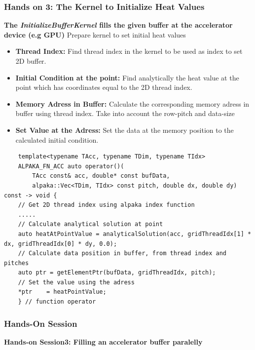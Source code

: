 \documentclass[9pt]{beamer}
\begin{document}
\begin{frame}[fragile]
\frametitle{Hands on 3: The Kernel to Initialize Heat Values}
\small

\textbf{ The \textit{InitializeBufferKernel} fills the given buffer at the accelerator device (e.g GPU)}
    \lstset{basicstyle=\ttfamily\scriptsize}
    Prepare kernel to set initial heat values
    \begin{itemize}
    \item \textbf{Thread Index:} Find thread index in the kernel to be used as index to set 2D buffer.
    \item \textbf{Initial Condition at the point:} Find analytically the heat value at the point which has coordinates equal to the 2D thread index.
    \item \textbf{Memory Adress in Buffer:} Calculate the corresponding memory adress in buffer using thread index. Take into account the row-pitch and data-size
    \item \textbf{Set Value at the Adress:} Set the data at the memory position to the calculated initial condition.
    \end{itemize}
     \lstset{basicstyle=\ttfamily\tiny}
    \begin{lstlisting}
    template<typename TAcc, typename TDim, typename TIdx>
    ALPAKA_FN_ACC auto operator()(
        TAcc const& acc, double* const bufData,
        alpaka::Vec<TDim, TIdx> const pitch, double dx, double dy) const -> void {
    // Get 2D thread index using alpaka index function
    .....
    // Calculate analytical solution at point
    auto heatAtPointValue = analyticalSolution(acc, gridThreadIdx[1] * dx, gridThreadIdx[0] * dy, 0.0);
    // Calculate data position in buffer, from thread index and pitches
    auto ptr = getElementPtr(bufData, gridThreadIdx, pitch);
    // Set the value using the adress
    *ptr    = heatPointValue;
    } // function operator
    \end{lstlisting}

\end{frame}





\begin{frame}
\frametitle{Hands-On Session}
\begin{center}
      \Huge \textbf{Hands-on Session3: Filling an accelerator buffer paralelly}
  \end{center}
\end{frame}
\end{document}
